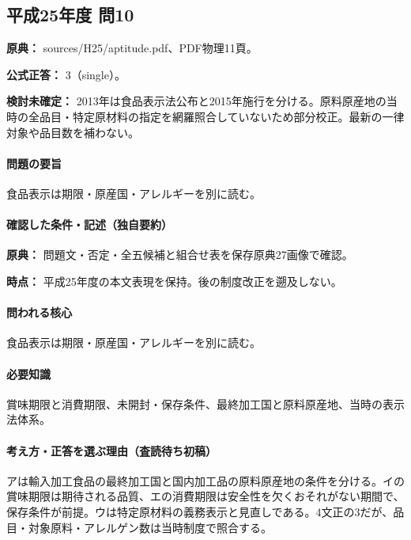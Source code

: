 \subsection{平成25年度 問10}
\label{q:h25-reg-apt-10}

\noindent\textbf{原典：} sources/H25/aptitude.pdf、PDF物理11頁。

\textbf{公式正答：} 3（single）。

\par\textbf{検討未確定：} 2013年は食品表示法公布と2015年施行を分ける。原料原産地の当時の全品目・特定原材料の指定を網羅照合していないため部分校正。最新の一律対象や品目数を補わない。

\paragraph{問題の要旨} 食品表示は期限・原産国・アレルギーを別に読む。

\paragraph{確認した条件・記述（独自要約）}\mbox{}\par

\noindent\textbf{原典：} 問題文・否定・全五候補と組合せ表を保存原典27画像で確認。\par

\noindent\textbf{時点：} 平成25年度の本文表現を保持。後の制度改正を遡及しない。\par

\paragraph{問われる核心} 食品表示は期限・原産国・アレルギーを別に読む。

\paragraph{必要知識} 賞味期限と消費期限、未開封・保存条件、最終加工国と原料原産地、当時の表示法体系。

\paragraph{考え方・正答を選ぶ理由（査読待ち初稿）} アは輸入加工食品の最終加工国と国内加工品の原料原産地の条件を分ける。イの賞味期限は期待される品質、エの消費期限は安全性を欠くおそれがない期間で、保存条件が前提。ウは特定原材料の義務表示と見直しである。4文正の3だが、品目・対象原料・アレルゲン数は当時制度で照合する。

